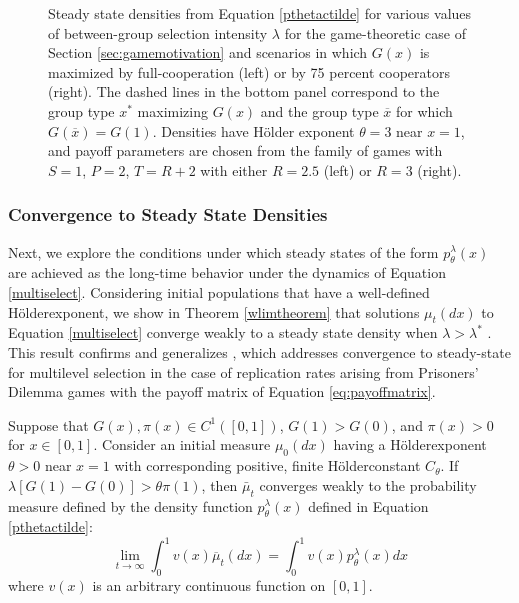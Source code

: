 \documentclass[11pt]{article}
\numberwithin{equation}{section}
\newcommand{\ol}{\overline}
\newcommand{\holder}{H{\"o}lder\:}
\newcommand{\ov}[1]{\overline{#1}}
\begin{document}
{\begin{figure}[tbhp]
\centering
\subfloat[$x^* = \ol{x} = 1$.]{\label{fig:a}\texttt{[image: DensityNoShadow.png]}} %
\caption{Steady state densities from Equation \eqref{pthetactilde} for various values of between-group selection intensity $\lambda$ for the game-theoretic case of Section \ref{sec:gamemotivation} and scenarios in which $G(x)$ is maximized by full-cooperation (left) or by 75 percent cooperators (right). The dashed lines in the bottom panel correspond to the group type $x^*$ maximizing $G(x)$ and the group type $\overline{x}$ for which $G(\overline{x}) = G(1)$. Densities have H{\"o}lder exponent $\theta = 3$ near $x=1$, and payoff parameters are chosen from the family of games with $S = 1$, $P = 2$, $T = R + 2$ with either $R = 2.5$ (left) or $R = 3$ (right).}
\label{fig:densityplot}
\end{figure}

\subsubsection{Convergence to Steady State Densities}
\label{sec:convergencesteadyresults}
 
Next, we explore the conditions under which steady states of the form $p^{\lambda}_{\theta}(x)$ are achieved as the long-time behavior under the dynamics of Equation \eqref{multiselect}. Considering initial populations that have a well-defined \holder exponent, we show in Theorem \ref{wlimtheorem} that solutions $\mu_t(dx)$ to Equation \eqref{multiselect} converge weakly to a steady state density when $\lambda > \lambda^*$%
. This result confirms and generalizes \cite[Conjecture 1]{cooney2020analysis}, which addresses convergence to steady-state for multilevel selection in the case of replication rates arising from Prisoners' Dilemma games with the payoff matrix of Equation \eqref{eq:payoffmatrix}. 

\begin{theorem}\label{wlimtheorem}
Suppose that $G(x),\pi(x) \in C^1\left([0,1]\right)$, $G(1) > G(0)$, and $\pi(x) > 0$ for $x \in [0,1]$. Consider an initial measure $\mu_0(dx)$ having a \holder exponent $\theta > 0$ near $x=1$ with corresponding positive, finite \holder constant  $C_{\theta}$.
If $\lambda \left[G(1) - G(0) \right] > \theta \pi(1)$, then $\bar{\mu}_t$ converges weakly to the probability measure defined by the density function $p^{\lambda}_\theta(x)$ defined in Equation \eqref{pthetactilde}:
\begin{equation}\label{vmubarlim}
\lim_{t\to \infty} \int_0^1 v(x)\ov{\mu}_t(dx)=\int_0^1 v(x)p^{\lambda}_{\theta}(x)dx
\end{equation}
where $v(x)$ is an arbitrary continuous function on $[0,1]$.
\end{theorem}

}
\end{document}
